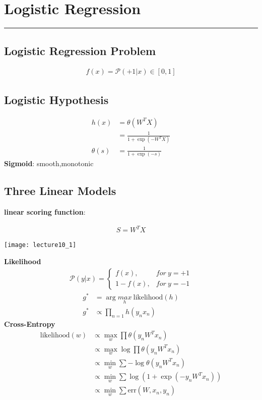 \section{Logistic Regression}
\noindent
{\color{LightRubineRed} \rule{\linewidth}{1mm} }

\subsection{Logistic Regression Problem} %
\label{sub:logistic_regression_problem}
\begin{gather*}
f(x) = \mathcal{P}(+1 | x ) \in [0,1]
\end{gather*}
\subsection{Logistic Hypothesis} %
\label{sub:logistic_hypothesis}
\begin{align*}
h(x) &= \theta{(W^TX)} \\
     &= \frac{1}{1+\exp{(-W^TX)}} \\
\theta(s) &= \frac{1}{1+\exp{(-s)}}
\end{align*}
\textbf{Sigmoid}: smooth,monotonic \par
\subsection{Three Linear Models}
\textbf{linear scoring function}: \par
\begin{gather*}
S = W^TX
\end{gather*}
\begin{center}
\texttt{[image: lecture10\_1]}\\
\end{center}
\textbf{Likelihood}
\begin{gather*}
\mathcal{P}(y|x) = 
\left\{  
             \begin{array}{lr}  
             f(x), &for \ y = + 1  \\  
             1- f(x), &for \ y= -1    
             \end{array}  
\right.  
\end{gather*}
\begin{align*}
 g^* &= \arg \underset{h}{max}\ \text{likelihood}(h) \\
 g^* & \propto \prod_{n=1}h(y_nx_n)
\end{align*}
\textbf{Cross-Entropy}
\begin{align*}
 \text{likelihood}{(w)} &\propto \underset{w}{\max} \prod \theta{(y_nW^Tx_n)} \\
 &\propto \underset{w}{\max} \log\prod\theta{(y_nW^Tx_n)} \\
 &\propto \underset{w}{\min} \sum - \log\theta{(y_nW^Tx_n)} \\
 &\propto \underset{w}{\min} \sum \log(1+\exp(-y_nW^Tx_n)) \\
 &\propto \underset{w}{\min} \sum \text{err}(W,x_n,y_n) \\
\end{align*}
 
